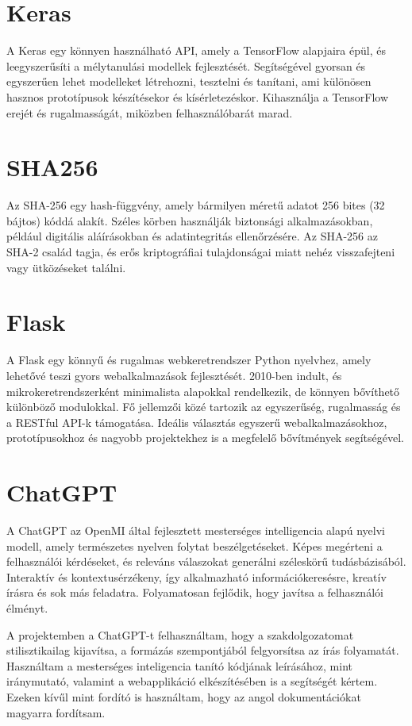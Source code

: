 \section{Keras}
A Keras egy könnyen használható API, amely a TensorFlow alapjaira épül, és leegyszerűsíti a mélytanulási modellek fejlesztését. Segítségével gyorsan és egyszerűen lehet modelleket létrehozni, tesztelni és tanítani, ami különösen hasznos prototípusok készítésekor és kísérletezéskor. Kihasználja a TensorFlow erejét és rugalmasságát, miközben felhasználóbarát marad.

\section{SHA256}
Az SHA-256 egy hash-függvény, amely bármilyen méretű adatot 256 bites (32 bájtos) kóddá alakít. Széles körben használják biztonsági alkalmazásokban, például digitális aláírásokban és adatintegritás ellenőrzésére. Az SHA-256 az SHA-2 család tagja, és erős kriptográfiai tulajdonságai miatt nehéz visszafejteni vagy ütközéseket találni.

\section{Flask}
A Flask egy könnyű és rugalmas webkeretrendszer Python nyelvhez, amely lehetővé teszi gyors webalkalmazások fejlesztését. 2010-ben indult, és mikrokeretrendszerként minimalista alapokkal rendelkezik, de könnyen bővíthető különböző modulokkal. Fő jellemzői közé tartozik az egyszerűség, rugalmasság és a RESTful API-k támogatása. Ideális választás egyszerű webalkalmazásokhoz, prototípusokhoz és nagyobb projektekhez is a megfelelő bővítmények segítségével.

\section{ChatGPT}
A ChatGPT az OpenMI által fejlesztett mesterséges intelligencia alapú nyelvi modell, amely természetes nyelven folytat beszélgetéseket. Képes megérteni a felhasználói kérdéseket, és releváns válaszokat generálni széleskörű tudásbázisából. Interaktív és kontextusérzékeny, így alkalmazható információkeresésre, kreatív írásra és sok más feladatra. Folyamatosan fejlődik, hogy javítsa a felhasználói élményt.

A projektemben a ChatGPT-t felhasználtam, hogy a szakdolgozatomat stilisztikailag kijavítsa, a formázás szempontjából felgyorsítsa az írás folyamatát. Használtam a mesterséges inteligencia tanító kódjának leírásához, mint iránymutató, valamint a webapplikáció elkészítésében is a segítségét kértem. Ezeken kívűl mint fordító is használtam, hogy az angol dokumentációkat magyarra fordítsam. 